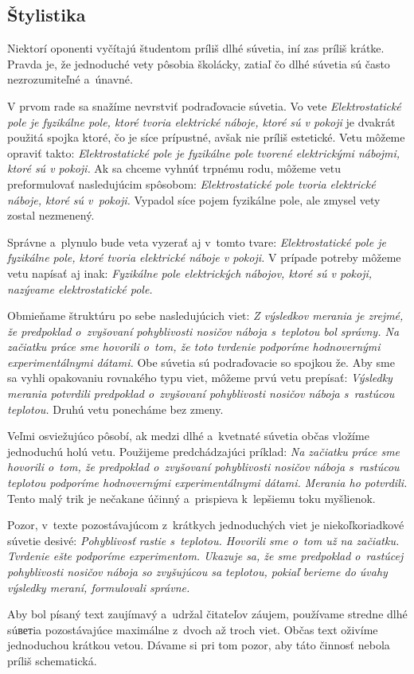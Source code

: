 \documentclass[../../../thesis.tex]{subfiles}
\begin{document}
\subsection{Štylistika}
Niektorí oponenti vyčítajú študentom príliš dlhé súvetia,
iní zas príliš krátke.
Pravda je, že jednoduché vety pôsobia školácky,
zatiaľ čo dlhé súvetia sú často nezrozumiteľné a~únavné.

V prvom rade sa snažíme nevrstviť podraďovacie súvetia.
Vo vete \emph{Elektrostatické pole je fyzikálne pole,
ktoré tvoria elektrické náboje, ktoré sú v pokoji}
je dvakrát použitá spojka ktoré,
čo je síce prípustné, avšak nie príliš estetické.
Vetu môžeme opraviť takto:
\emph{Elektrostatické pole je fyzikálne
pole tvorené elektrickými nábojmi, ktoré sú v pokoji.}
Ak sa chceme vyhnúť trpnému rodu,
môžeme vetu preformulovať nasledujúcim spôsobom:
\emph{Elektrostatické pole tvoria elektrické náboje,
ktoré sú v~pokoji.}
Vypadol síce pojem fyzikálne pole,
ale zmysel vety zostal nezmenený.

Správne a~plynulo bude veta vyzerať aj v~tomto tvare:
\emph{Elektrostatické pole je fyzikálne pole,
ktoré tvoria elektrické náboje v pokoji.}
V prípade potreby môžeme vetu napísať aj inak:
\emph{Fyzikálne pole elektrických nábojov,
ktoré sú v pokoji, nazývame elektrostatické pole.}

Obmieňame štruktúru po sebe nasledujúcich viet:
\emph{Z výsledkov merania je zrejmé,
že predpoklad o~zvyšovaní pohyblivosti nosičov náboja
s~teplotou bol správny.
Na začiatku práce sme hovorili o~tom,
že toto tvrdenie podporíme hodnovernými experimentálnymi dátami.}
Obe súvetia sú podraďovacie so spojkou že.
Aby sme sa vyhli opakovaniu rovnakého typu viet,
môžeme prvú vetu prepísať:
\emph{Výsledky merania potvrdili predpoklad o~zvyšovaní
pohyblivosti nosičov náboja s~rastúcou teplotou.}
Druhú vetu ponecháme bez zmeny.

Veľmi osviežujúco pôsobí, ak medzi dlhé a~kvetnaté súvetia
občas vložíme jednoduchú holú vetu.
Použijeme predchádzajúci príklad:
\emph{Na začiatku práce sme hovorili o~tom,
že predpoklad o~zvyšovaní pohyblivosti nosičov náboja
s~rastúcou teplotou podporíme hodnovernými
experimentálnymi dátami.
Merania ho potvrdili.}
Tento malý trik je nečakane účinný a~prispieva k~lepšiemu
toku myšlienok.

Pozor, v~texte pozostávajúcom z~krátkych jednoduchých viet
je niekoľkoriadkové súvetie desivé:
\emph{Pohyblivosť rastie s~teplotou.
Hovorili sme o~tom už na začiatku.
Tvrdenie ešte podporíme experimentom.
Ukazuje sa, že sme predpoklad o~rastúcej pohyblivosti
nosičov náboja so zvyšujúcou sa teplotou,
pokiaľ berieme do úvahy výsledky meraní,
formulovali správne.}

Aby bol písaný text zaujímavý a~udržal čitateľov záujem,
používame stredne dlhé súветia pozostávajúce maximálne
z~dvoch až troch viet.
Občas text oživíme jednoduchou krátkou vetou.
Dávame si pri tom pozor,
aby táto činnosť nebola príliš schematická.
\end{document}

